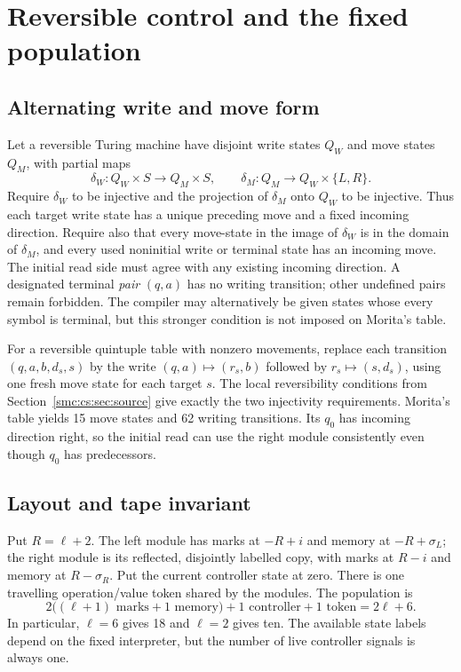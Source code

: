 \documentclass[11pt,letterpaper]{article}
\numberwithin{equation}{section}
\theoremstyle{definition}
\theoremstyle{remark}
\newcommand{\sig}{\sigma}\newcommand{\blank}{\mathsf b}
\begin{document}
\section{Reversible control and the fixed population}\label{smc:cs:sec:compiler}
\subsection{Alternating write and move form}
Let a reversible Turing machine have disjoint write states $Q_W$ and move states $Q_M$, with partial maps
\[
 \delta_W:Q_W\times S\longrightarrow Q_M\times S,
 \qquad
 \delta_M:Q_M\longrightarrow Q_W\times\{L,R\}.
\]
Require $\delta_W$ to be injective and the projection of $\delta_M$ onto $Q_W$ to be injective. Thus each target write state has a unique preceding move and a fixed incoming direction. Require also that every move-state in the image of $\delta_W$ is in the domain of $\delta_M$, and every used noninitial write or terminal state has an incoming move. The initial read side must agree with any existing incoming direction. A designated terminal \emph{pair} $(q,a)$ has no writing transition; other undefined pairs remain forbidden. The compiler may alternatively be given states whose every symbol is terminal, but this stronger condition is not imposed on Morita's table.

For a reversible quintuple table with nonzero movements, replace each transition $(q,a,b,d_s,s)$ by the write $(q,a)\mapsto(r_s,b)$ followed by $r_s\mapsto(s,d_s)$, using one fresh move state for each target $s$. The local reversibility conditions from Section~\ref{smc:cs:sec:source} give exactly the two injectivity requirements. Morita's table yields 15 move states and 62 writing transitions. Its $q_0$ has incoming direction right, so the initial read can use the right module consistently even though $q_0$ has predecessors.

\subsection{Layout and tape invariant}
Put $R=\ell+2$. The left module has marks at $-R+i$ and memory at $-R+\sig_L$; the right module is its reflected, disjointly labelled copy, with marks at $R-i$ and memory at $R-\sig_R$. Put the current controller state at zero. There is one travelling operation/value token shared by the modules. The population is
\begin{equation}\label{smc:cs:eq:population}
 2\bigl((\ell+1)\text{ marks}+1\text{ memory}\bigr)
   +1\text{ controller}+1\text{ token}=2\ell+6.
\end{equation}
In particular, $\ell=6$ gives 18 and $\ell=2$ gives ten. The available state labels depend on the fixed interpreter, but the number of live controller signals is always one.
\end{document}
